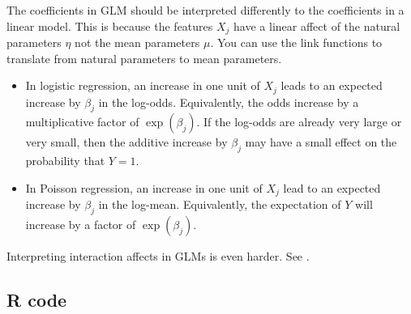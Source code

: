 The coefficients in  GLM should be interpreted differently to the coefficients in a linear model. This is because the features $X_j$ have a linear affect of the natural parameters $\eta$ not the mean parameters $\mu$. You can use the link functions to translate from natural parameters to mean parameters. 

\begin{itemize}
    \item In logistic regression, an increase in one unit of $X_j$ leads to an expected increase by $\beta_j$ in the log-odds. Equivalently, the odds increase by a multiplicative factor of $\exp(\beta_j)$. If the log-odds are already very large or very small, then the additive increase by $\beta_j$ may have a small effect on the probability that $Y=1$.
    \item In Poisson regression, an increase in one unit of $X_j$ lead to an expected increase by $\beta_j$ in the log-mean. Equivalently, the expectation of $Y$ will increase by a factor of $\exp(\beta_j)$.
\end{itemize}
Interpreting interaction affects in GLMs is even harder. See \cite{rohrer_arslan_interactions}.


\subsection{R code}

